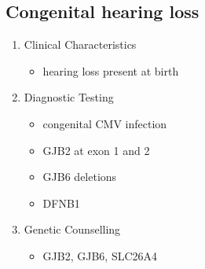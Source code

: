 \documentclass[12pt]{scrartcl}
\begin{document}
\subsection{Congenital hearing loss}
\label{sec:orgeeae974}
\begin{enumerate}
\item Clinical Characteristics
\label{sec:orgf94b0f4}
\begin{itemize}
\item hearing loss present at birth
\end{itemize}
\item Diagnostic Testing
\label{sec:org1a501c8}
\begin{itemize}
\item congenital CMV infection
\item GJB2 at exon 1 and 2
\item GJB6 deletions
\item DFNB1
\end{itemize}
\item Genetic Counselling
\label{sec:org8e3c430}
\begin{itemize}
\item GJB2, GJB6, SLC26A4
\end{itemize}
\end{enumerate}
\end{document}
